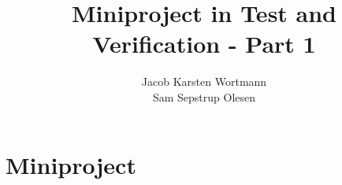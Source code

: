 \documentclass[a4paper,12pt]{memoir}
\title{Miniproject in Test and Verification - Part 1}
\author{Jacob Karsten Wortmann\\Sam Sepstrup Olesen}
\begin{document}
\maketitle

\chapter*{Miniproject}
\end{document}
